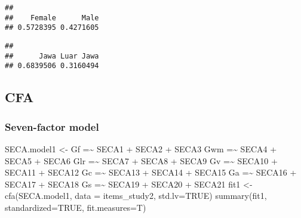 \documentclass[
]{article}
\newenvironment{Shaded}{\begin{snugshade}}{\end{snugshade}}
\newcommand{\AttributeTok}[1]{\textcolor[rgb]{0.77,0.63,0.00}{#1}}
\newcommand{\ConstantTok}[1]{\textcolor[rgb]{0.00,0.00,0.00}{#1}}
\newcommand{\FunctionTok}[1]{\textcolor[rgb]{0.00,0.00,0.00}{#1}}
\newcommand{\NormalTok}[1]{#1}
\newcommand{\OtherTok}[1]{\textcolor[rgb]{0.56,0.35,0.01}{#1}}
\newcommand{\SpecialCharTok}[1]{\textcolor[rgb]{0.00,0.00,0.00}{#1}}
\newcommand{\StringTok}[1]{\textcolor[rgb]{0.31,0.60,0.02}{#1}}
\begin{document}
\begin{verbatim}
## 
##    Female      Male 
## 0.5728395 0.4271605
\end{verbatim}

\begin{Shaded}
\end{Shaded}

\begin{verbatim}
## 
##      Jawa Luar Jawa 
## 0.6839506 0.3160494
\end{verbatim}

\hypertarget{cfa}{%
\subsection{CFA}\label{cfa}}

\hypertarget{seven-factor-model}{%
\subsubsection{Seven-factor model}\label{seven-factor-model}}

\begin{Shaded}
\begin{Highlighting}[]
\NormalTok{SECA.model1 }\OtherTok{\textless{}{-}} \StringTok{\textquotesingle{} }
\StringTok{Gf  =\textasciitilde{} SECA1 + SECA2 + SECA3}
\StringTok{Gwm =\textasciitilde{} SECA4 + SECA5 + SECA6}
\StringTok{Glr  =\textasciitilde{} SECA7 + SECA8 + SECA9}
\StringTok{Gv =\textasciitilde{} SECA10 + SECA11 + SECA12}
\StringTok{Gc =\textasciitilde{} SECA13 + SECA14 + SECA15}
\StringTok{Ga =\textasciitilde{} SECA16 + SECA17 + SECA18}
\StringTok{Gs =\textasciitilde{} SECA19 + SECA20 + SECA21}
\StringTok{\textquotesingle{}}
\NormalTok{fit1 }\OtherTok{\textless{}{-}} \FunctionTok{cfa}\NormalTok{(SECA.model1, }\AttributeTok{data =}\NormalTok{ items\_study2, }\AttributeTok{std.lv=}\ConstantTok{TRUE}\NormalTok{)}
\FunctionTok{summary}\NormalTok{(fit1, }\AttributeTok{standardized=}\ConstantTok{TRUE}\NormalTok{, }\AttributeTok{fit.measures=}\NormalTok{T)}
\end{Highlighting}
\end{Shaded}
\end{document}

